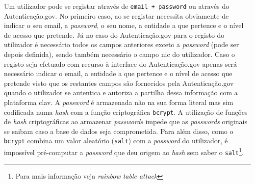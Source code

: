 Um utilizador pode se registar através de \texttt{email + password} ou através do Autenticação.gov. 
No primeiro caso, ao se registar necessita obviamente de indicar o seu email, a \textit{password}, o seu nome, 
a entidade a que pertence e o nível de acesso que pretende. 
Já no caso do Autenticação.gov para o registo do utilizador é necessário todos os campos anteriores exceto a 
\textit{password} (pode ser depois definida), sendo também necessário o campo \acrfull{nic} do utilizador. 
Caso o registo seja efetuado com recurso à interface do Autenticação.gov apenas será necessário indicar o email, 
a entidade a que pertence e o nível de acesso que pretende visto que os restantes campos são fornecidos pela 
Autenticação.gov quando o utilizador se autentica e autoriza a partilha dessa informação com a plataforma
\acrshort{clav}.
A \textit{password} é armazenada não na sua forma literal mas sim codificada numa \textit{hash} com a função 
criptográfica \texttt{bcrypt}. A utilização de funções de \textit{hash} criptográficas ao armazenar 
\textit{passwords} impede que as \textit{passwords} originais se saibam caso a base de dados seja comprometida. 
Para além disso, como o \texttt{bcrypt} combina um valor aleatório (\texttt{salt}) com a \textit{password} do 
utilizador, é impossível pré-computar a \textit{password} que deu origem ao \textit{hash} sem saber o 
\texttt{salt}\footnote{Para mais informação veja \textit{rainbow table attack}}.

